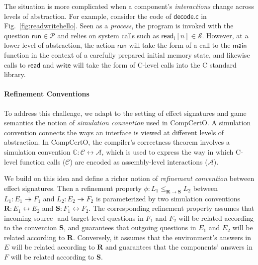 \documentclass[acmsmall,nonacm]{acmart}
\newcommand{\kw}[1]{\ensuremath{ \mathsf{#1} }}
\newcommand{\idsc}{\mathbf{id}} %
\newcommand{\vcomp}{\fatsemi}
\begin{document}
The situation is more complicated
when a component's \emph{interactions} change
across levels of abstraction.
For example,
consider the code of $\kw{decode.c}$
in Fig.~\ref{fig:readwritehello}.
Seen as a \emph{process},
the program is invoked with the question
$\kw{run} \in \mathcal{P}$
and relies on system calls such as $\kw{read}_i[n] \in \mathcal{S}$.
However, at a lower level of abstraction,
the action $\kw{run}$
will take the form of a call to the $\kw{main}$ function
in the context of a carefully prepared initial memory state,
and likewise calls to $\kw{read}$ and $\kw{write}$
will take the form of C-level calls into the C standard library.


\paragraph{Refinement Conventions}

To address this challenge,
we adapt to the setting of effect signatures and game semantics
the notion of \emph{simulation convention} used in CompCertO.
A simulation convention connects
the ways an interface is viewed at different levels of abstraction.
In CompCertO,
the compiler's correctness theorem involves
a simulation convention
$\mathbb{C} : \mathcal{C} \leftrightarrow \mathcal{A}$,
which is used to express the way in which
C-level function calls ($\mathcal{C}$) are encoded
as assembly-level interactions ($\mathcal{A}$).

We build on this idea and
define a richer notion of \emph{refinement convention} between effect signatures.
Then a refinement property
$\phi : L_1 \le_{\mathbf{R} \rightarrow \mathbf{S}} L_2$
between
$L_1 : E_1 \twoheadrightarrow F_1$ and 
$L_2 : E_2 \twoheadrightarrow F_2$
is parameterized by two simulation conventions
$\mathbf{R} : E_1 \leftrightarrow E_2$ and
$\mathbf{S} : F_1 \leftrightarrow F_2$.
The corresponding refinement property assumes that incoming
source- and target-level questions in $F_1$ and $F_2$
will be related according to the convention $\mathbf{S}$,
and guarantees that outgoing questions in $E_1$ and $E_2$
will be related according to $\mathbf{R}$.
Conversely, it assumes that
the environment's answers in $E$
will be related according to $\mathbf{R}$
and guarantees that the components' answers in $F$
will be related according to $\mathbf{S}$.

\end{document}
